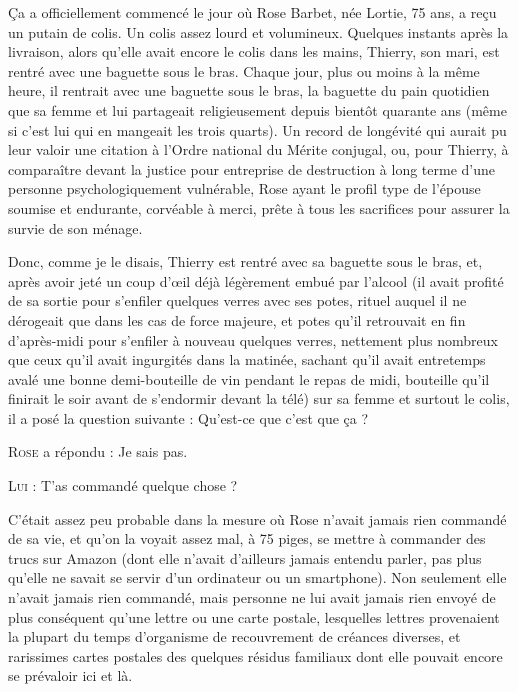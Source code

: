 \illusloflabel{}%
%
Ça a officiellement commencé le jour où Rose Barbet, née Lortie, 75 ans, a reçu un putain de colis. Un colis assez lourd et volumineux. Quelques instants après la livraison, alors qu’elle avait encore le colis dans les mains, Thierry, son mari, est rentré avec une baguette sous le bras. Chaque jour, plus ou moins à la même heure, il rentrait avec une baguette sous le bras, la baguette du pain quotidien que sa femme et lui partageait religieusement depuis bientôt quarante ans (même si c’est lui qui en mangeait les trois quarts). Un record de longévité qui aurait pu leur valoir une citation à l’Ordre national du Mérite conjugal, ou, pour Thierry, à comparaître devant la justice pour entreprise de destruction à long terme d’une personne psychologiquement vulnérable, Rose ayant le profil type de l’épouse soumise et endurante, corvéable à merci, prête à tous les sacrifices pour assurer la survie de son ménage.

Donc, comme je le disais, Thierry est rentré avec sa baguette sous le bras, et, après avoir jeté un coup d’œil déjà légèrement embué par l’alcool (il avait profité de sa sortie pour s’enfiler quelques verres avec ses potes, rituel auquel il ne dérogeait que dans les cas de force majeure, et potes qu’il retrouvait en fin d’après-midi pour s’enfiler à nouveau quelques verres, nettement plus nombreux que ceux qu’il avait ingurgités dans la matinée, sachant qu’il avait entretemps avalé une bonne demi-bouteille de vin pendant le repas de midi, bouteille qu’il finirait le soir avant de s’endormir devant la télé) sur sa femme et surtout le colis, il a posé la question suivante : Qu’est-ce que c’est que ça ?

\begin{dialogue}
  
\textsc{Rose} a répondu : Je sais pas.

\textsc{Lui} : T’as commandé quelque chose ?
  
\end{dialogue}

C’était assez peu probable dans la mesure où Rose n’avait jamais rien commandé de sa vie, et qu’on la voyait assez mal, à 75 piges, se mettre à commander des trucs sur Amazon (dont elle n’avait d’ailleurs jamais entendu parler, pas plus qu’elle ne savait se servir d’un ordinateur ou un smartphone). Non seulement elle n’avait jamais rien commandé, mais personne ne lui avait jamais rien envoyé de plus conséquent qu’une lettre ou une carte postale, lesquelles lettres provenaient la plupart du temps d’organisme de recouvrement de créances diverses, et rarissimes cartes postales des quelques résidus familiaux dont elle pouvait encore se prévaloir ici et là.

